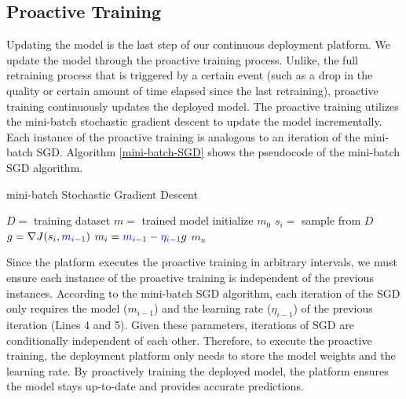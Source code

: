 
\subsection{Proactive Training}\label{proactive-training}
Updating the model is the last step of our continuous deployment platform.
We update the model through the proactive training process.
Unlike, the full retraining process that is triggered by a certain event (such as a drop in the quality or certain amount of time elapsed since the last retraining), proactive training continuously updates the deployed model.
The proactive training utilizes the mini-batch stochastic gradient descent to update the model incrementally.
Each instance of the proactive training is analogous to an iteration of the mini-batch SGD.
Algorithm \ref{mini-batch-SGD} shows the pseudocode of the mini-batch SGD algorithm.
\begin{algorithm}
\caption{mini-batch Stochastic Gradient Descent}\label{mini-batch-SGD}
\begin{algorithmic}[1]
\Require  $D=$ training dataset
\Ensure $m=$ trained model
\State initialize $m_0$
	\State $s_i =$ sample from $D$
	\State $g = \nabla J(s_i, \textcolor{blue}{m_{i-1}})$
	\State $m_i = \textcolor{blue}{m_{i-1}} - \textcolor{blue}{\eta_{i-1}}g$
\EndFor
\State \Return $m_n$
\end{algorithmic}
\end{algorithm}
Since the platform executes the proactive training in arbitrary intervals, we must ensure each instance of the proactive training is independent of the previous instances.
According to the mini-batch SGD algorithm, each iteration of the SGD only requires the model ($m_{i-1}$) and the learning rate ($\eta_{i-1}$) of the previous iteration (Lines 4 and 5).
Given these parameters, iterations of SGD are conditionally independent of each other.
Therefore, to execute the proactive training, the deployment platform only needs to store the model weights and the learning rate.
By proactively training the deployed model, the platform ensures the model stays up-to-date and provides accurate predictions.

